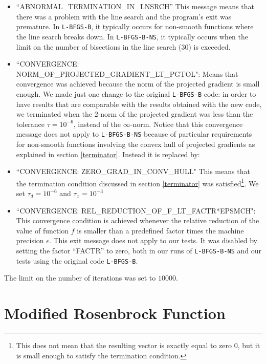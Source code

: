 \begin{itemize}

\item ``ABNORMAL\_TERMINATION\_IN\_LNSRCH'' This message means that there was a problem with the line search and the program's exit was premature. In \texttt{L-BFGS-B}, it typically occurs for non-smooth functions where the line search breaks down. In \texttt{L-BFGS-B-NS}, it typically occurs when the limit on the number of bisections in the line search ($30$) is exceeded.

\item ``CONVERGENCE: NORM\_OF\_PROJECTED\_GRADIENT\_LT\_PGTOL": Means that convergence was achieved because the norm of the projected gradient is small enough. We made just one change to the original \texttt{L-BFGS-B} code: in order to have results that are comparable with the results obtained with the new code, we terminated when the $2$-norm of the projected gradient was less than the tolerance $\tau =10^{-6}$, instead of the $\infty$-norm. Notice that this convergence message does not apply to \texttt{L-BFGS-B-NS} because of particular requirements for non-smooth functions involving the convex hull of projected gradients as explained in section \ref{terminator}. Instead it is replaced by:

\item ``CONVERGENCE: ZERO\_GRAD\_IN\_CONV\_HULL" This means that the termination condition discussed in section \ref{terminator} was satisfied\footnote{This does not mean that the resulting vector is exactly equal to zero $0$, but it is small enough to satisfy the termination condition.}. We set $\tau_d = 10^{-6}$ and $\tau_x = 10^{-3}$

\item ``CONVERGENCE: REL\_REDUCTION\_OF\_F\_LT\_FACTR*EPSMCH": This convergence condition is achieved whenever the relative reduction of the value of function $f$ is smaller than a predefined factor times the machine precision $\epsilon$. This exit message does not apply to our tests. It was disabled by setting the factor ``FACTR'' to zero, both in our runs of \texttt{L-BFGS-B-NS} and our tests using the original code \texttt{L-BFGS-B}.

\end{itemize}

The limit on the number of iterations was set to $10000$.

\section{Modified Rosenbrock Function} \label{ros}

